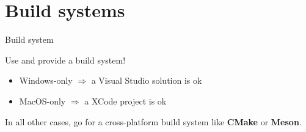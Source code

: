 \documentclass[compress]{beamer}
\begin{document}
%
%
%
%



\section{Build systems}

\begin{frame}[label=cmake]{Build system}

    Use and provide a build system!

    \begin{itemize}
        \item Windows-only $\Rightarrow$ a Visual Studio solution is ok
        \item MacOS-only $\Rightarrow$ a XCode project is ok
    \end{itemize}

    In all other cases, go for a cross-platform build system like {\bf
    CMake} or {\bf Meson}.
\end{frame}
\end{document}
